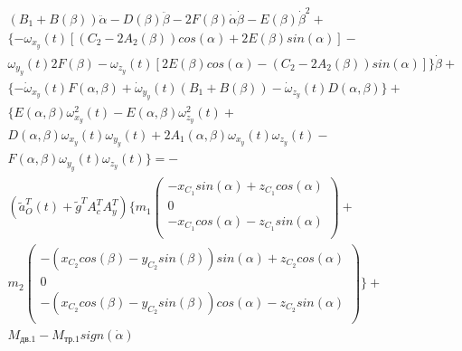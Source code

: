 \begin{equation}%
\label{eq:p3:46}
\begin{multlined}
	( 
		B_{1}+
		B ( \beta ) 
	) \ddot \alpha -
	D ( \beta ) \ddot \beta -
	2F ( \beta ) \dot \alpha \dot \beta -
	E ( \beta ) \dot{\beta}^{2}+ \\
	 \lbrace 
	 	- \omega _{x_{y}} ( t ) 
	 		[ 
	 			( C_{2}-2A_{2} ( \beta ) ) cos ( \alpha ) +
	 			2E ( \beta ) sin ( \alpha ) 
	 		] - \\ 
	 	\omega _{y_{y}} ( t ) 
	 		2F ( \beta ) - 
	 	\omega _{z_{y}} ( t ) 
	 		[ 
	 			 2E ( \beta ) cos ( \alpha ) - 
	 			 ( C_{2}-2A_{2} ( \beta ) ) sin ( \alpha ) 
	 		] 
	 \rbrace 
	 \dot \beta +\\ 
	 \lbrace 
	 	- \dot\omega _{x_{y}} ( t ) F ( \alpha, \beta ) + 
	 	\dot\omega _{y_{y}} ( t ) ( B_{1}+B ( \beta ) ) - 
	 	\dot\omega _{z_{y}} ( t ) D ( \alpha, \beta ) 
	 \rbrace 
 	+\\
 	\lbrace 
 		E ( \alpha, \beta ) \omega _{x_{y}}^{2} ( t ) -
 		E ( \alpha, \beta ) \omega _{z_{y}}^{2} ( t ) + \\
 		D ( \alpha, \beta ) \omega _{x_{y}} ( t ) \omega _{y_{y}} ( t ) +
 		2A_{1} ( \alpha, \beta ) \omega _{x_{y}} ( t ) \omega _{z_{y}} ( t ) -\\
 		F ( \alpha, \beta ) \omega _{y_{y}} ( t ) \omega _{z_{y}} ( t ) 
 	\rbrace 
 =-\\
( 
	\tilde{a}_{O}^{T} ( t ) +\tilde{g}^{T}A_{c}^{T}A_{y}^{T} 
) 
\lbrace 
	m_{1} 
	\left( 
	\begin{array}{c}
		-x_{C_{1}}sin ( \alpha ) +z_{C_{1}}cos ( \alpha ) \\
		0\\
		-x_{C_{1}}cos ( \alpha ) -z_{C_{1}}sin ( \alpha ) \\
	\end{array}
	\right) +\\
	m_2
	\left( 
	\begin{array}{c}
	- \left( x_{C_{2}}cos \left( \beta \right) -y_{C_{2}}sin \left( \beta \right) \right) sin \left( \alpha \right) +z_{C_{2}}cos \left( \alpha \right)\\
	0\\
	- \left( x_{C_{2}}cos \left( \beta \right) -y_{C_{2}}sin \left( \beta \right) \right) cos \left( \alpha \right) -z_{C_{2}}sin \left( \alpha \right)\\
	\end{array}
	\right) 
\rbrace 
+\\
M_{\textit{дв.1}}-M_{\textit{тр.1}}sign ( \dot \alpha )
\end{multlined}
\end{equation}


